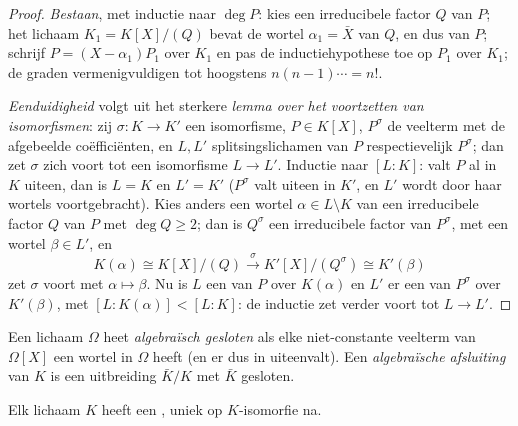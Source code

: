 \begin{proof}
\emph{Bestaan}, met inductie naar $\deg P$: kies een irreducibele
factor $Q$ van $P$; het lichaam $K_1 = K[X]/(Q)$ bevat de wortel
$\alpha_1 = \bar X$ van $Q$, en dus van $P$; schrijf $P = (X -
\alpha_1)P_1$ over $K_1$ en pas de inductiehypothese toe op $P_1$
over $K_1$; de graden vermenigvuldigen tot hoogstens
$n(n-1)\cdots = n!$.

\emph{Eenduidigheid} volgt uit het sterkere \emph{lemma over het
voortzetten van isomorfismen}: zij $\sigma \colon K \to K'$ een
isomorfisme, $P \in K[X]$, $P^\sigma$ de veelterm met de
afgebeelde coëfficiënten, en $L, L'$ splitsingslichamen van $P$
respectievelijk $P^\sigma$; dan zet $\sigma$ zich voort tot een
isomorfisme $L \to L'$. Inductie naar $[L:K]$: valt $P$ al in $K$
uiteen, dan is $L = K$ en $L' = K'$ ($P^\sigma$ valt uiteen in
$K'$, en $L'$ wordt door haar wortels voortgebracht). Kies anders
een wortel $\alpha \in L \setminus K$ van een irreducibele factor
$Q$ van $P$ met $\deg Q \geq 2$; dan is $Q^\sigma$ een
irreducibele factor van $P^\sigma$, met een wortel $\beta \in
L'$, en
\[
K(\alpha) \cong K[X]/(Q) \xrightarrow{\ \sigma\ }
K'[X]/(Q^\sigma) \cong K'(\beta)
\]
zet $\sigma$ voort met $\alpha \mapsto \beta$. Nu is $L$ een
 van $P$ over $K(\alpha)$ en $L'$ er een van
$P^\sigma$ over $K'(\beta)$, met $[L : K(\alpha)] < [L:K]$: de
inductie zet verder voort tot $L \to L'$.
\end{proof}

\begin{definition}\label{def:b3:galois:closure}
Een lichaam $\Omega$ heet \emph{algebraïsch
gesloten} als elke
niet-constante veelterm van $\Omega[X]$ een wortel in $\Omega$
heeft (en er dus in uiteenvalt). Een \emph{algebraïsche
afsluiting} van $K$ is een
 uitbreiding $\bar K/K$ met $\bar K$ 
gesloten.
\end{definition}

\begin{theorem}[Steinitz]\label{thm:b3:galois:steinitz}
Elk lichaam $K$ heeft een , uniek op
$K$-isomorfie na.
\end{theorem}

